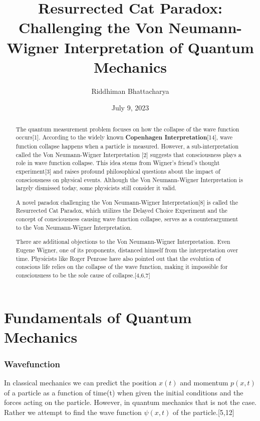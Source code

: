 \documentclass{article}
\title{\huge \textbf{Resurrected Cat Paradox: Challenging the Von Neumann-Wigner Interpretation of Quantum Mechanics}}
\author{\Large Riddhiman Bhattacharya}
\date{July 9, 2023}
\begin{document}
\maketitle
\Large 
\begin{abstract}
\Large

The quantum measurement problem focuses on how the collapse of the wave function occurs[1]. According to the widely known \textbf{Copenhagen Interpretation}[14], wave function collapse happens when a particle is measured. However, a sub-interpretation called the Von Neumann-Wigner Interpretation [2] suggests that consciousness plays a role in wave function collapse. This idea stems from Wigner's friend's thought experiment[3] and raises profound philosophical questions about the impact of consciousness on physical events. Although the Von Neumann-Wigner Interpretation is largely dismissed today, some physicists still consider it valid.

A novel paradox challenging the Von Neumann-Wigner Interpretation[8] is called the Resurrected Cat Paradox, which utilizes the Delayed Choice Experiment and the concept of consciousness causing wave function collapse, serves as a counterargument to the Von Neumann-Wigner Interpretation.

There are additional objections to the Von Neumann-Wigner Interpretation. Even Eugene Wigner, one of its proponents, distanced himself from the interpretation over time. Physicists like Roger Penrose have also pointed out that the evolution of conscious life relies on the collapse of the wave function, making it impossible for consciousness to be the sole cause of collapse.[4,6,7]

\end{abstract}


\section{\Large Fundamentals of Quantum Mechanics}

\subsubsection{\Large \textbf{Wavefunction}}
In classical mechanics we can predict the position $x(t)$ and momentum $p(x,t)$ of a particle as a function of time(t) when given the initial conditions and the forces acting on the particle. However, in quantum mechanics that is not the case. Rather we attempt to find the wave function  $\psi(x,t)$ of the particle.[5,12]
\end{document}
